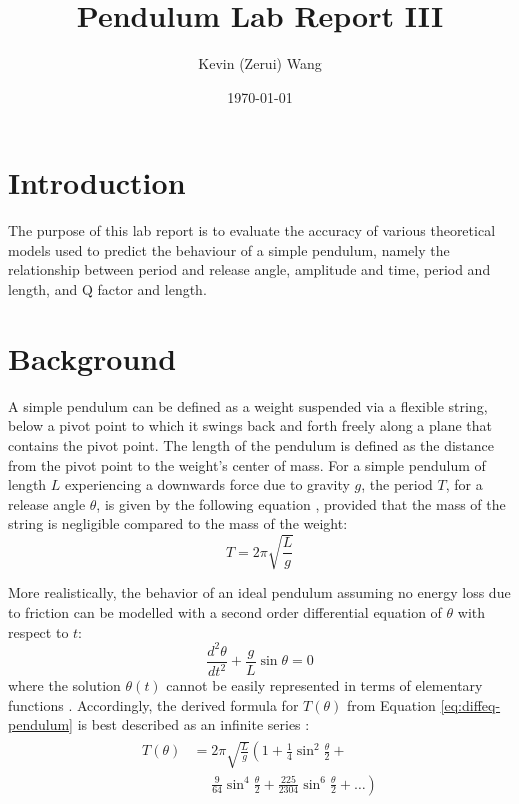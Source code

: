 \documentclass[11pt]{article}
\title{Pendulum Lab Report III}
\author{Kevin (Zerui) Wang}
\date{\today}
\begin{document}
\maketitle

\newpage


\begin{multicols}{2}
\section{Introduction}
{\color{blue}The purpose of this lab report is to evaluate the accuracy of various theoretical models used to predict the behaviour of a simple pendulum, namely the relationship between period and release angle, amplitude and time, period and length, and Q factor and length.}

\section{Background} \label{Background}
A simple pendulum can be defined as a weight suspended via a flexible string, below a pivot point to which it swings back and forth freely along a plane that contains the pivot point. The length of the pendulum is defined as the distance from the pivot point to the weight's center of mass. For a simple pendulum of length $L$ experiencing a downwards force due to gravity $g$, the period $T$, for a release angle $\theta$, is given by the following equation \cite{the-simple-pendulum}, provided that the mass of the string is negligible compared to the mass of the weight:
\begin{equation} \label{eq:l-over-g}
    T = 2\pi \sqrt{\frac{L}{g}}
\end{equation}



More realistically, the behavior of an ideal pendulum assuming no energy loss due to friction can be modelled with a second order differential equation of $\theta$ with respect to $t$:
\begin{equation} \label{eq:diffeq-pendulum}
    \frac{d^2\theta}{dt^2} + \frac{g}{L}\sin{\theta} = 0
\end{equation}
where the solution $\theta(t)$ cannot be easily represented in terms of elementary functions \cite{no-elementary-fns}. Accordingly, the derived formula for $T(\theta)$ from Equation \ref{eq:diffeq-pendulum} is best described as an infinite series \cite{no-elementary-fns-2}:
\begin{align} \label{eq:power-series-derived}
\begin{split}
    T(\theta) &= 2\pi\sqrt{\frac{L}{g}} \left(1 + \frac{1}{4}\sin^2\frac{\theta}{2} \right. + \\
    &\phantom{{}=}\left. \frac{9}{64}\sin^4\frac{\theta}{2} + \frac{225}{2304}\sin^6\frac{\theta}{2} + \ldots \right)
\end{split}
\end{align}



\end{multicols}
\end{document}
